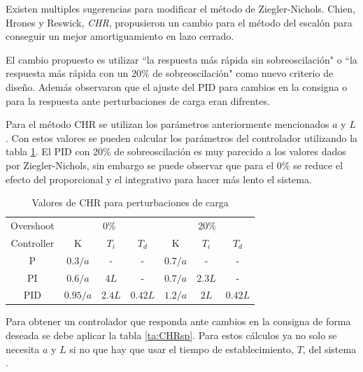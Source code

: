 \documentclass{book}
\begin{document}
Existen multiples sugerencias para modificar el m\'etodo de Ziegler-Nichols. Chien, Hrones y Reswick, \emph{CHR}, propusieron un cambio para el m\'etodo del escal\'on para conseguir un mejor amortiguamiento en lazo cerrado. \par

El cambio propuesto es utilizar ``la respuesta m\'as r\'apida sin sobreoscilaci\'on" o ``la respuesta m\'as r\'apida con un 20\% de sobreoscilaci\'on" como nuevo criterio de diseño. Adem\'as observaron que el ajuste del PID para cambios en la consigna o para la respuesta ante perturbaciones de carga eran difrentes. \par

Para el m\'etodo CHR se utilizan los par\'ametros anteriormente mencionados $a$ y $L$. Con estos valores se pueden calcular los par\'ametros del controlador utilizando la tabla \ref{ta:CHRload}. El PID con 20\% de sobreoscilaci\'on es muy parecido a los valores dados por Ziegler-Nichols, sin embargo se puede observar que para el 0\% se reduce el efecto del proporcional y el integrativo para hacer m\'as lento el sistema. \par

\begin{table}[h!]
\centering
\caption{Valores de CHR para perturbaciones de carga \cite{PIDbook}}
\label{ta:CHRload}
\begin{tabular}{@{}c|cccccc@{}}
Overshoot  & \multicolumn{3}{c}{0\%}      & \multicolumn{3}{c}{20\%}    \\
Controller & K        & $T_{i}$ & $T_{d}$ & K       & $T_{i}$ & $T_{d}$ \\ \hline
P          & $0.3/a$  & -       & -       & $0.7/a$ & -       & -       \\
PI         & $0.6/a$  & $4L$    & -       & $0.7/a$ & $2.3L$  & -       \\
PID        & $0.95/a$ & $2.4L$  & $0.42L$ & $1.2/a$ & $2L$    & $0.42L$ \\ 
\end{tabular}
\end{table} 

Para obtener un controlador que responda ante cambios en la consigna de forma deseada se debe aplicar la tabla \ref{ta:CHRsp}. Para estos c\'alculos ya no solo se necesita $a$ y $L$ si no que hay que usar el tiempo de establecimiento, $T$, del sistema \cite{PIDbook}. \par
\end{document}
